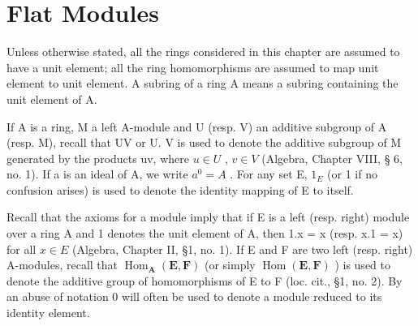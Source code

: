 \chapter{Flat Modules}

Unless otherwise stated, all the rings considered in this chapter are assumed to have a unit element; all the ring homomorphisms are assumed to map unit element to unit element. A subring of a ring A means a subring containing the unit element of A.

If A is a ring, M a left A-module and U (resp. V) an additive subgroup of A (resp. M), recall that UV or U. V is used to denote the additive subgroup of M generated by the products uv, where \(u \in U\) , \(v \in V\) (Algebra, Chapter VIII, § 6, no. 1). If a is an ideal of A, we write \(a^{0} = A\) . For any set E, \(1_{E}\) (or 1 if no confusion arises) is used to denote the identity mapping of E to itself.

Recall that the axioms for a module imply that if E is a left (resp. right) module over a ring A and 1 denotes the unit element of A, then 1.x = x (resp. x.1 = x) for all \(x \in E\) (Algebra, Chapter II, §1, no. 1). If E and F are two left (resp. right) A-modules, recall that \(\operatorname{Hom}_{\mathbf{A}}(\mathbf{E}, \mathbf{F})\) (or simply \(\operatorname{Hom}(\mathbf{E}, \mathbf{F})\) ) is used to denote the additive group of homomorphisms of E to F (loc. cit., §1, no. 2). By an abuse of notation 0 will often be used to denote a module reduced to its identity element.

